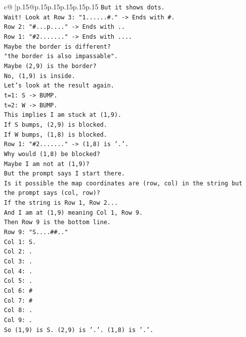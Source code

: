 \documentclass{article}
\begin{document}
{\begin{supertabular}{c@{$\;$}|p{.15\linewidth}@{}p{.15\linewidth}p{.15\linewidth}p{.15\linewidth}p{.15\linewidth}p{.15\linewidth}}
{{{\texttt{But it shows dots.} \\
\texttt{Wait! Look at Row 3: "1......\#." {-}> Ends with \#.} \\
\texttt{Row 2: "\#...p...." {-}> Ends with ..} \\
\texttt{Row 1: "\#2......." {-}> Ends with ....} \\
\texttt{Maybe the border is different?} \\
\texttt{"the border is also impassable".} \\
\texttt{Maybe (2,9) is the border?} \\
\texttt{No, (1,9) is inside.} \\
\texttt{Let's look at the result again.} \\
\texttt{t=1: S {-}> BUMP.} \\
\texttt{t=2: W {-}> BUMP.} \\
\texttt{This implies I am stuck at (1,9).} \\
\texttt{If S bumps, (2,9) is blocked.} \\
\texttt{If W bumps, (1,8) is blocked.} \\
\texttt{Row 1: "\#2......." {-}> (1,8) is '.'.} \\
\texttt{Why would (1,8) be blocked?} \\
\texttt{Maybe I am not at (1,9)?} \\
\texttt{But the prompt says I start there.} \\
\texttt{Is it possible the map coordinates are (row, col) in the string but the prompt says (col, row)?} \\
\texttt{If the string is Row 1, Row 2...} \\
\texttt{And I am at (1,9) meaning Col 1, Row 9.} \\
\texttt{Then Row 9 is the bottom line.} \\
\texttt{Row 9: "S....\#\#.."} \\
\texttt{Col 1: S.} \\
\texttt{Col 2: .} \\
\texttt{Col 3: .} \\
\texttt{Col 4: .} \\
\texttt{Col 5: .} \\
\texttt{Col 6: \#} \\
\texttt{Col 7: \#} \\
\texttt{Col 8: .} \\
\texttt{Col 9: .} \\
\texttt{So (1,9) is S. (2,9) is '.'. (1,8) is '.'.} \\
}}}
\end{supertabular}}
\end{document}
